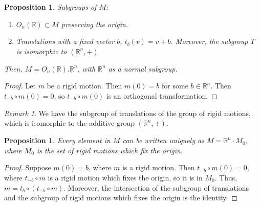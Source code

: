\documentclass[12pt]{article}
\newtheorem{prop}[thm]{Proposition}
\theoremstyle{definition}
\theoremstyle{remark}
\newtheorem{rmk}[thm]{Remark}
\numberwithin{equation}{section}
\newcommand\R{\mathbb R}    %
\begin{document}
\vspace{15pt}

\begin{prop}
        Subgroups of $M$:\begin{enumerate}
                \item $O_n(\R) \subset M$ preserving the origin.
                \item Translations with a fixed vector $b$, $t_b(v) = v+b$. Moreover, the subgroup $T$ is isomorphic to $(\R^n,+)$
        \end{enumerate}
        Then, $M = O_n(\R).\R^n$, with $\R^n$ as a normal subgroup.
\end{prop}
\begin{proof}
        Let $m$ be a rigid motion. Then $m(0) = b$ for some $b \in \R^n$. Then $t_{-b}\circ m(0) = 0$, so $t_{-b}\circ m(0)$ is an orthogonal transformation.
\end{proof}

\vspace{15pt}

\begin{rmk}
        We have the subgroup of translations of the group of rigid motions, which is isomorphic to the additive group $(\R^n,+)$.
\end{rmk}

\vspace{15pt}

\begin{prop}
        Every element in $M$ can be written uniquely as $M = \R^n\cdot M_0$, where $M_0$ is the set of rigid motions which fix the origin.
\end{prop}
\begin{proof}
        Suppose $m(0) = b$, where $m$ is a rigid motion. Then $t_{-b}\circ m(0) = 0$, where $t_{-b}\circ m$ is a rigid motion which fixes the origin, so it is in $M_0$. Thus, $m = t_{b}\circ(t_{-b}\circ m)$. Moreover, the intersection of the subgroup of translations and the subgroup of rigid motions which fixes the origin is the identity.
\end{proof}

\vspace{15pt}
\end{document}
